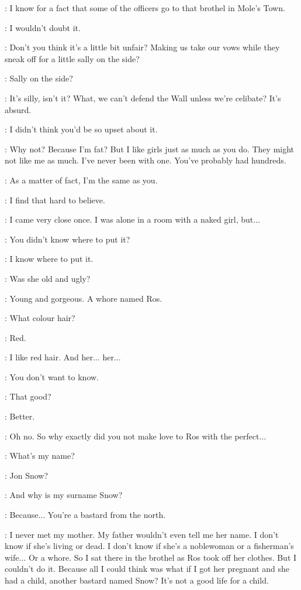 \SAM: I know for a fact that some of the officers go to that brothel in Mole's Town. 

\JON: I wouldn't doubt it. 

\SAM: Don't you think it's a little bit unfair? Making us take our vows while they sneak off for a little sally on the side? 

\JON: Sally on the side? 

\SAM: It's silly, isn't it? What, we can't defend the Wall unless we're celibate? It's absurd. 

\JON: I didn't think you'd be so upset about it. 

\SAM: Why not? Because I'm fat? But I like girls just as much as you do. They might not like me as much. I've never been with one. You've probably had hundreds. 

\JON: As a matter of fact, I'm the same as you. 

\SAM: I find that hard to believe. 

\JON: I came very close once. I was alone in a room with a naked girl, but$\ldots$ 

\SAM: You didn't know where to put it? 

\JON: I know where to put it. 

\SAM: Was she old and ugly? 

\JON: Young and gorgeous. A whore named Ros. 

\SAM: What colour hair? 

\JON: Red. 

\SAM: I like red hair. And her$\ldots$ her$\ldots$ 

\JON: You don't want to know. 

\SAM: That good? 

\JON: Better. 

\SAM: Oh no. So why exactly did you not make love to Ros with the perfect$\ldots$ 

\JON: What's my name? 

\SAM: Jon Snow? 

\JON: And why is my surname Snow? 

\SAM: Because$\ldots$ You're a bastard from the north. 

\JON: I never met my mother. My father wouldn't even tell me her name. I don't know if she's living or dead. I don't know if she's a noblewoman or a fisherman's wife$\ldots$ Or a whore. So I sat there in the brothel as Ros took off her clothes. But I couldn't do it. Because all I could think was what if I got her pregnant and she had a child, another bastard named Snow? It's not a good life for a child. 

